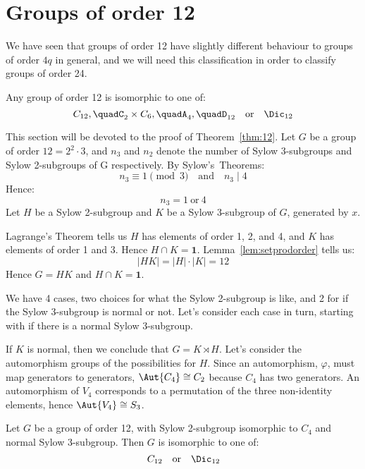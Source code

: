 \section{Groups of order 12}
We have seen that groups of order 12 have slightly different behaviour to groups of order \(4q\) in general, and we will
need this classification in order to classify groups of order 24.

\begin{theorem}\label{thm:12}
    Any group of order 12 is isomorphic to one of:
    \[
        C_{12}, \quad%
        C_2 \times C_6, \quad%
        A_4, \quad%
        D_{12} \quad \text{or} \quad%
        \Dic_{12}
    \]
\end{theorem}

This section will be devoted to the proof of Theorem~\ref{thm:12}.
Let \(G\) be a group of order \(12 = 2^2 \cdot 3\), and \(n_3\) and \(n_2\) denote the number of Sylow 3-subgroups and
Sylow 2-subgroups of G respectively.
By Sylow's~Theorems:
\[n_3 \equiv 1 \pmod{3} \quad \text{and} \quad n_3 \mid 4\]
Hence:
\[n_3 = 1 \ \text{or} \ 4\]
Let \(H\) be a Sylow 2-subgroup and \(K\) be a Sylow 3-subgroup of \(G\), generated by \(x\).

Lagrange's Theorem tells us \(H\) has elements of order 1, 2, and 4, and \(K\) has elements of order 1 and 3.
Hence \(H \cap K = \bm{1}\).
Lemma~\ref{lem:setprodorder} tells us:
\[|HK| = |H| \cdot |K| = 12\]
Hence \(G = HK\) and \(H \cap K = \bm{1}\).

We have 4 cases, two choices for what the Sylow 2-subgroup is like, and 2 for if the Sylow 3-subgroup is normal or not.
Let's consider each case in turn, starting with if there is a normal Sylow 3-subgroup.

If \(K\) is normal, then we conclude that \(G = K \rtimes H\).
Let's consider the automorphism groups of the possibilities for \(H\).
Since an automorphism, \(\varphi\), must map generators to generators, \(\Aut{C_4} \cong C_2\) because \(C_4\) has two
generators.
An automorphism of \(V_4\) corresponds to a permutation of the three
non-identity elements, hence \(\Aut{V_4} \cong S_3\).


\begin{lemma}
    Let \(G\) be a group of order 12, with Sylow 2-subgroup isomorphic to \(C_4\) and normal Sylow 3-subgroup.
    Then \(G\) is isomorphic to one of:
    \[
        C_{12} \quad \text{or} \quad%
        \Dic_{12}
    \]
\end{lemma}


